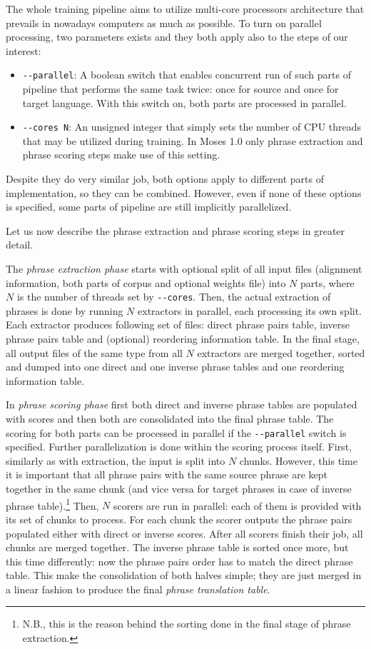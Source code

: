 The whole training pipeline aims to utilize multi-core processors architecture that
prevails in nowadays computers as much as possible. To turn on parallel processing,
two parameters exists and they both apply also to the steps of our interest:
\begin{itemize}
  \item \verb|--parallel|: A boolean switch that enables concurrent run of such parts of
  pipeline that performs the same task twice: once for source and once for target language.
  With this switch on, both parts are processed in parallel.
  \item \verb|--cores N|: An unsigned integer that simply sets the number of CPU threads
  that may be utilized during training. In Moses 1.0 only phrase extraction and phrase
  scoring steps make use of this setting.
\end{itemize}
Despite they do very similar job, both options apply to different parts
of implementation, so they can be combined.
However, even if none of these options is specified, some parts of pipeline
are still implicitly parallelized.

Let us now describe the phrase extraction and phrase scoring steps in greater detail.

The \emph{phrase extraction phase} starts with optional split of all input files
(alignment information, both parts of corpus and optional weights file) into $N$
parts, where $N$ is the number of threads set by \verb|--cores|.
Then, the actual extraction of phrases is done by running $N$ extractors in parallel,
each processing its own split.
Each extractor produces following set of files: direct phrase pairs table, inverse
phrase pairs table and (optional) reordering information table.
In the final stage, all output files of the same type from all $N$ extractors are
merged together, sorted and dumped into one direct and one inverse phrase tables
and one reordering information table.

In \emph{phrase scoring phase} first both direct and inverse phrase tables are
populated with scores and then both are consolidated into the final phrase table.
The scoring for both parts can be processed in parallel if the \verb|--parallel|
switch is specified.
Further parallelization is done within the scoring process itself.
First, similarly as with extraction, the input is split into $N$ chunks.
However, this time it is important that all phrase pairs with the same source
phrase are kept together in the same chunk (and vice versa for target phrases
in case of inverse phrase table).\footnote{N.B., this is the reason behind the sorting done in the final stage of phrase extraction.}
Then, $N$ scorers are run in parallel: each of them is provided with its set
of chunks to process.
For each chunk the scorer outputs the phrase pairs populated either with direct
or inverse scores.
After all scorers finish their job, all chunks are merged together.
The inverse phrase table is sorted once more, but this time differently:
now the phrase pairs order has to match the direct phrase table.
This make the consolidation of both halves simple; they are just merged
in a linear fashion to produce the final \emph{phrase translation table}.

